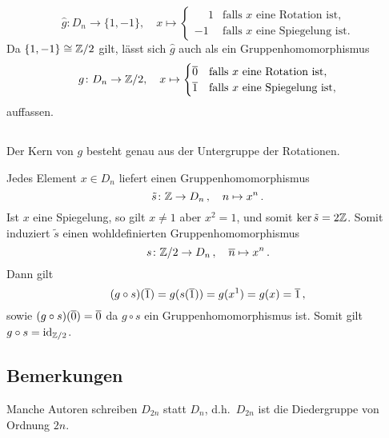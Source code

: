 \[
          \hat{g}
  \colon  D_n
  \to     \{1, -1\},
  \quad   x
  \mapsto \begin{cases}
            \phantom{-}1  & \text{falls $x$ eine Rotation ist}, \\
                      -1  & \text{falls $x$ eine Spiegelung ist}.
          \end{cases}
\]
Da $\{1, -1\} \cong \mathbb{Z}/2$ gilt, lässt sich $\hat{g}$ auch als ein Gruppenhomomorphismus
\[
          g
  \colon  D_n
  \to     \mathbb{Z}/2,
  \quad   x
  \mapsto \begin{cases}
            \overline{0} & \text{falls $x$ eine Rotation ist}, \\
            \overline{1} & \text{falls $x$ eine Spiegelung ist},
          \end{cases}
\]
auffassen.





\subsection{}

Der Kern von $g$ besteht genau aus der Untergruppe der Rotationen.

Jedes Element $x \in D_n$ liefert einen Gruppenhomomorphismus
\[
          \tilde{s}
  \colon  \mathbb{Z}
  \to     D_n\,,
  \quad   n
  \mapsto x^n\,.
\]
Ist $x$ eine Spiegelung, so gilt $x \neq 1$ aber $x^2 = 1$, und somit $\ker \tilde{s} = 2\mathbb{Z}$.
Somit induziert $\tilde{s}$ einen wohldefinierten Gruppenhomomorphismus
\[
          s
  \colon  \mathbb{Z}/2
  \to     D_n\,,
  \quad   \overline{n}
  \mapsto x^n\,.
\]
Dann gilt
\[
    (g \circ s)(\overline{1})
  = g(s(\overline{1}))
  = g(x^1)
  = g(x)
  = \overline{1}\,,
\]
sowie $(g \circ s)(\overline{0}) = \overline{0}$ da $g \circ s$ ein Gruppenhomomorphismus ist.
Somit gilt $g \circ s = \operatorname{id}_{\mathbb{Z}/2}$.





\subsection*{Bemerkungen}

\begin{remark}
  Manche Autoren schreiben $D_{2n}$ statt $D_n$, d.h.\ $D_{2n}$ ist die Diedergruppe von Ordnung $2n$.
\end{remark}


